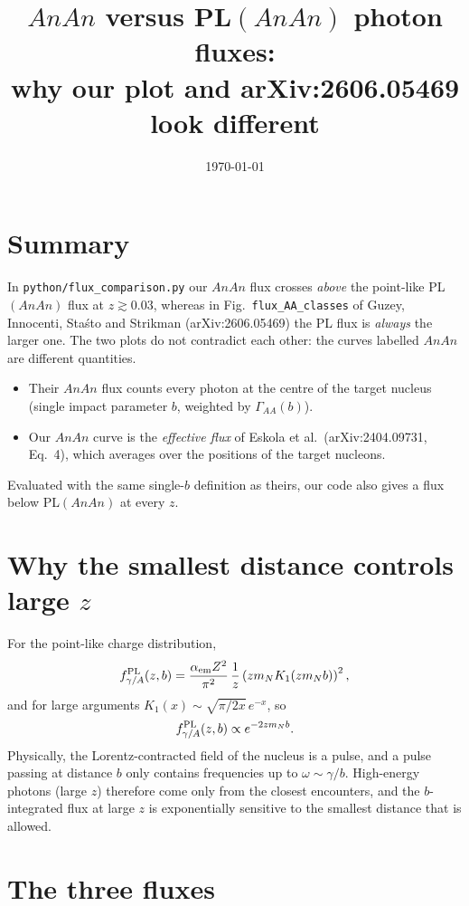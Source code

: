 \documentclass[11pt]{article}
\title{$AnAn$ versus PL$(AnAn)$ photon fluxes:\\
why our plot and arXiv:2606.05469 look different}
\author{}
\date{\today}
\begin{document}
\maketitle

\section{Summary}

In \texttt{python/flux\_comparison.py} our $AnAn$ flux crosses \emph{above}
the point-like PL$(AnAn)$ flux at $z\gtrsim0.03$, whereas in
Fig.~\texttt{flux\_AA\_classes} of Guzey, Innocenti, Sta\'sto and Strikman
(arXiv:2606.05469) the PL flux is \emph{always} the larger one. The two plots
do not contradict each other: the curves labelled $AnAn$ are different
quantities.
\begin{itemize}
  \item Their $AnAn$ flux counts every photon at the centre of the target
    nucleus (single impact parameter $b$, weighted by $\Gamma_{AA}(b)$).
  \item Our $AnAn$ curve is the \emph{effective flux} of Eskola et al.\
    (arXiv:2404.09731, Eq.~4), which averages over the positions of the
    target nucleons.
\end{itemize}
Evaluated with the same single-$b$ definition as theirs, our code also gives
a flux below PL$(AnAn)$ at every $z$.

\section{Why the smallest distance controls large $z$}

For the point-like charge distribution,
\begin{equation}
  f^{\rm PL}_{\gamma/A}(z,b) = \frac{\alpha_{\rm em}Z^2}{\pi^2}\,\frac1z
  \left(z m_N K_1(z m_N b)\right)^2 ,
\end{equation}
and for large arguments $K_1(x)\sim\sqrt{\pi/2x}\,e^{-x}$, so
\begin{equation}
  f^{\rm PL}_{\gamma/A}(z,b) \propto e^{-2 z m_N b}.
\end{equation}
Physically, the Lorentz-contracted field of the nucleus is a pulse, and a
pulse passing at distance $b$ only contains frequencies up to
$\omega\sim\gamma/b$. High-energy photons (large $z$) therefore come only
from the closest encounters, and the $b$-integrated flux at large $z$ is
exponentially sensitive to the smallest distance that is allowed.

\section{The three fluxes}
\end{document}
